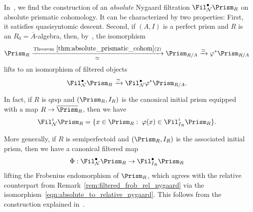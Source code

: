 \documentclass[10pt]{amsart}
\begin{document}
\begin{remark}
\label{subsubsec:absolute_nygaard}
In~\cite[\S 5.5]{bhatt2022absolute}, we find the construction of an \emph{absolute} Nygaard filtration $\Fil^\bullet_{\mathcal{N}}\Prism_R$ on absolute prismatic cohomology. It can be characterized by two properties: First, it satisfies quasisyntomic descent. Second, if $(A,I)$ is a perfect prism and $R$ is an $R_0=\overline{A}$-algebra, then, by~\cite[Theorem 5.6.2]{bhatt2022absolute}, the isomorphism
\[
\Prism_{R}\xrightarrow[\simeq]{\text{Theorem}~\ref{thm:absolute_prismatic_cohom}(2)}\Prism_{R/A}\xrightarrow{\simeq}\varphi^*\Prism_{R/A}
\]
lifts to an isomorphism of filtered objects
\begin{align}\label{eqn:absolute_to_relative_nygaard}
\Fil^\bullet_{\mathcal{N}}\Prism_R\xrightarrow{\simeq}\Fil^\bullet_{\mathcal{N}}\varphi^*\Prism_{R/A}.
\end{align}

In fact, if $R$ is qrsp and $(\Prism_R,I_R)$ is the canonical initial prism equipped with a map $R\to \overline{\Prism}_R$, then we have
\[
\Fil^i_{\mathcal{N}}\Prism_R = \{x\in \Prism_R:\;\varphi(x)\in \Fil^i_{I_R}\Prism_R\}.
\]

More generally, if $R$ is semiperfectoid and $(\Prism_R,I_R)$ is the associated initial prism, then we have a canonical filtered map
\[
\Phi:\Fil^\bullet_{\mathcal{N}}\Prism_R\to \Fil^\bullet_{I_R}\Prism_R
\]
lifting the Frobenius endomorphism of $\Prism_R$, which agrees with the relative counterpart from Remark~\ref{rem:filtered_frob_rel_nygaard} via the isomorphism~\eqref{eqn:absolute_to_relative_nygaard}. This follows from the construction explained in~\cite[Notation 5.7.5]{bhatt2022absolute}.
\end{remark}
\end{document}
